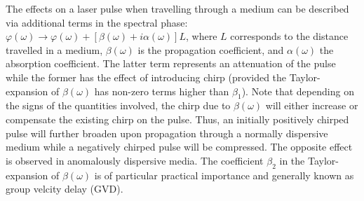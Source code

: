 \documentclass[a4paper]{jpconf}
\begin{document}
The effects on a laser pulse when travelling through a medium can be described via additional terms in the spectral phase: $\varphi(\omega) \to \varphi(\omega) + [\beta(\omega) + i \alpha(\omega)]L$, where $L$ corresponds to the distance travelled in a medium, $\beta(\omega)$ is the propagation coefficient, and $\alpha(\omega)$ the absorption coefficient. The latter term represents an attenuation of the pulse while the former has the effect of introducing chirp (provided the Taylor-expansion of $\beta(\omega)$ has non-zero terms higher than $\beta_1$). Note that depending on the signs of the quantities involved, the chirp due to $\beta(\omega)$ will either increase or compensate the existing chirp on the pulse. Thus, an initially positively chirped pulse will further broaden upon propagation through a normally dispersive medium while a negatively chirped pulse will be compressed. The opposite effect is observed in anomalously dispersive media. The coefficient $\beta_2$ in the Taylor-expansion of $\beta(\omega)$ is of particular practical importance and generally known as group velcity delay (GVD).
\end{document}
